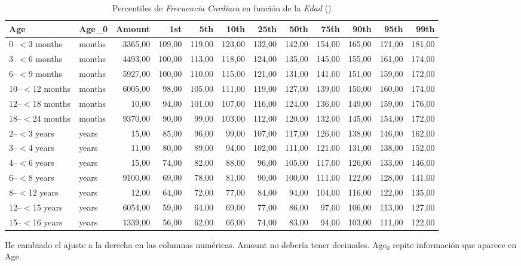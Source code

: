 \newpage
\thispagestyle{empty}
\begin{landscape}
    \begin{table}[htbp]
        \centering
        \caption{Percentiles de \textit{Frecuencia Cardiaca} en función de la \textit{Edad} (\cite{percentilesFenton2015})}
        \label{tabla:age_percentiles}
        \begin{tabular}{|l|l|r|r|r|r|r|r|r|r|r|r|}
            \toprule
            Age & Age\_0 & {Amount} & {1st} & {5th} & {10th} & {25th} & {50th} & {75th} & {90th} & {95th} & {99th} \\
            \midrule
            0--$<$3 months & months & 3365,00 & 109,00 & 119,00 & 123,00 & 132,00 & 142,00 & 154,00 & 165,00 & 171,00 & 181,00 \\
            3--$<$6 months & months & 4493,00 & 100,00 & 113,00 & 118,00 & 124,00 & 135,00 & 145,00 & 155,00 & 161,00 & 174,00 \\
            6--$<$9 months & months & 5927,00 & 100,00 & 110,00 & 115,00 & 121,00 & 131,00 & 141,00 & 151,00 & 159,00 & 172,00 \\
            10--$<$12 months & months & 6005,00 & 98,00 & 105,00 & 111,00 & 119,00 & 127,00 & 139,00 & 150,00 & 160,00 & 174,00 \\
            12--$<$18 months & months & 10,00 & 94,00 & 101,00 & 107,00 & 116,00 & 124,00 & 136,00 & 149,00 & 159,00 & 176,00 \\
            18--$<$24 months & months & 9370,00 & 90,00 & 99,00 & 103,00 & 112,00 & 120,00 & 132,00 & 145,00 & 154,00 & 172,00 \\
            2--$<$3 years & years & 15,00 & 85,00 & 96,00 & 99,00 & 107,00 & 117,00 & 126,00 & 138,00 & 146,00 & 162,00 \\
            3--$<$4 years & years & 11,00 & 80,00 & 89,00 & 94,00 & 102,00 & 111,00 & 121,00 & 131,00 & 138,00 & 152,00 \\
            4--$<$6 years & years & 15,00 & 74,00 & 82,00 & 88,00 & 96,00 & 105,00 & 117,00 & 126,00 & 133,00 & 146,00 \\
            6--$<$8 years & years & 9100,00 & 69,00 & 78,00 & 81,00 & 90,00 & 100,00 & 111,00 & 122,00 & 128,00 & 141,00 \\
            8--$<$12 years & years & 12,00 & 64,00 & 72,00 & 77,00 & 84,00 & 94,00 & 104,00 & 116,00 & 122,00 & 135,00 \\
            12--$<$15 years & years & 6054,00 & 59,00 & 64,00 & 69,00 & 77,00 & 86,00 & 97,00 & 106,00 & 113,00 & 127,00 \\
            15--$<$16 years & years & 1339,00 & 56,00 & 62,00 & 66,00 & 74,00 & 83,00 & 94,00 & 103,00 & 111,00 & 122,00 \\
            \bottomrule
        \end{tabular}
    \end{table}

{\color{blue} He cambiado el ajuste a la derecha en las columnas numéricas. Amount no debería tener decimales. Age$_0$ repite información que aparece en Age.}
    
\end{landscape}

